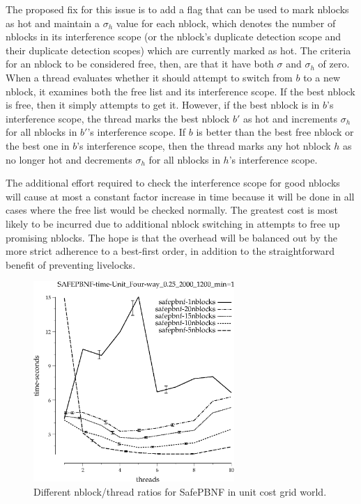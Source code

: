 \documentclass{article}
\begin{document}
The proposed fix for this issue is to add a flag that can be used to mark nblocks as hot and maintain a $\sigma_h$ value for each nblock, which denotes the number of nblocks in its interference scope (or the nblock's duplicate detection scope and their duplicate detection scopes) which are currently marked as hot. The criteria for an nblock to be considered free, then, are that it have both $\sigma$ and $\sigma_h$ of zero. When a thread evaluates whether it should attempt to switch from $b$ to a new nblock, it examines both the free list and its interference scope. If the best nblock is free, then it simply attempts to get it. However, if the best nblock is in $b$'s interference scope, the thread marks the best nblock $b'$ as hot and increments $\sigma_h$ for all nblocks in $b'$'s interference scope. If $b$ is better than the best free nblock or the best one in $b$'s interference scope, then the thread marks any hot nblock $h$ as no longer hot and decrements $\sigma_h$ for all nblocks in $h$'s interference scope.

The additional effort required to check the interference scope for good nblocks will cause at most a constant factor increase in time because it will be done in all cases where the free list would be checked normally. The greatest cost is most likely to be incurred due to additional nblock switching in attempts to free up promising nblocks. The hope is that the overhead will be balanced out by the more strict adherence to a best-first order, in addition to the straightforward benefit of preventing livelocks.

\begin{figure}[h!]
\includegraphics[width=3in]{../graphs/grid_unit_four-way_0.25_2000_1200/SAFEPBNF-time-Unit_Four-way_0.25_2000_1200_min=10.eps}
\caption{Different nblock/thread ratios for SafePBNF in unit cost grid world.}
\label{fig:SafePBNF-nblock-grid}
\end{figure}
\end{document}
